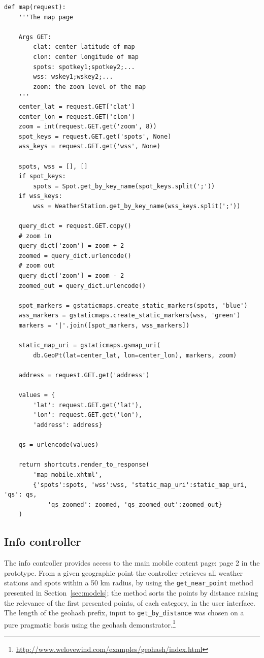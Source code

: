 \begin{lstlisting}
def map(request):
    '''The map page
    
    Args GET:
        clat: center latitude of map
        clon: center longitude of map
        spots: spotkey1;spotkey2;...
        wss: wskey1;wskey2;...
        zoom: the zoom level of the map
    '''
    center_lat = request.GET['clat']
    center_lon = request.GET['clon']
    zoom = int(request.GET.get('zoom', 8))        
    spot_keys = request.GET.get('spots', None)
    wss_keys = request.GET.get('wss', None)
        
    spots, wss = [], []
    if spot_keys:
        spots = Spot.get_by_key_name(spot_keys.split(';'))
    if wss_keys:
        wss = WeatherStation.get_by_key_name(wss_keys.split(';'))

    query_dict = request.GET.copy()
    # zoom in
    query_dict['zoom'] = zoom + 2
    zoomed = query_dict.urlencode()
    # zoom out
    query_dict['zoom'] = zoom - 2 
    zoomed_out = query_dict.urlencode()
    
    spot_markers = gstaticmaps.create_static_markers(spots, 'blue')
    wss_markers = gstaticmaps.create_static_markers(wss, 'green')
    markers = '|'.join([spot_markers, wss_markers])
    
    static_map_uri = gstaticmaps.gsmap_uri(
        db.GeoPt(lat=center_lat, lon=center_lon), markers, zoom)
    
    address = request.GET.get('address')
    
    values = {
        'lat': request.GET.get('lat'),
        'lon': request.GET.get('lon'),
        'address': address}
    
    qs = urlencode(values)
    
    return shortcuts.render_to_response(
        'map_mobile.xhtml',
        {'spots':spots, 'wss':wss, 'static_map_uri':static_map_uri, 'qs': qs,
            'qs_zoomed': zoomed, 'qs_zoomed_out':zoomed_out}        
    )
\end{lstlisting}

\subsection{Info controller}
The info controller provides access to the main mobile content page: page 2 in
the prototype. From a given geographic point the controller retrieves all weather
stations and spots within a 50 km radius, by using the \verb|get_near_point|
method presented in Section~\ref{sec:models}; the method sorts the points by
distance raising the relevance of the first presented points, of each category,
in the user interface. The length of the geohash prefix, input to
\verb|get_by_distance| was chosen on a pure pragmatic basis using the geohash
demonstrator.\footnote{\url{http://www.welovewind.com/examples/geohash/index.html}}

